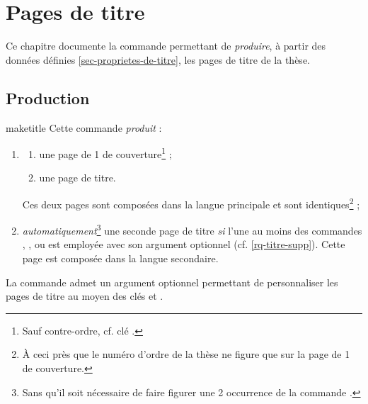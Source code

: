 \chapter{Pages de titre}\label{cha-pages-de-titre}

Ce chapitre documente la commande  permettant de
\emph{produire}, à partir des données définies \vref{sec-proprietes-de-titre},
les pages de titre de la thèse.

\section{Production}

\begin{docCommand}[doc description=\mandatory]{maketitle}{}%
  Cette commande \emph{produit} :
  \begin{enumerate}
  \item
    \begin{enumerate}
    \item une page de 1\iere{} de couverture\footnote{Sauf contre-ordre,
        cf. clé .} ;
    \item une page de titre.
    \end{enumerate}
    Ces deux pages sont composées dans la langue principale et
    sont identiques\footnote{À ceci près que le numéro d'ordre de la thèse ne figure
      que sur la page de 1\iere{} de couverture.} ;
  \item \emph{automatiquement}\footnote{Sans qu'il soit nécessaire de faire
      figurer une 2\ieme{} occurrence de la commande .} une
    seconde page de titre \emph{si}  l'une au moins des
    commandes , ,  ou
     est employée avec son argument optionnel
    (cf. \vref{rq-titre-supp}). Cette page est composée dans la langue
    secondaire.
  \end{enumerate}
\end{docCommand}

La commande  admet un argument optionnel permettant de
personnaliser les pages de titre au moyen des clés  et
.%


